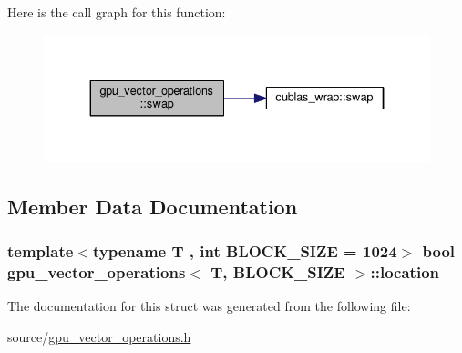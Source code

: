 Here is the call graph for this function\-:
\nopagebreak
\begin{figure}[H]
\begin{center}
\leavevmode
\includegraphics[width=334pt]{structgpu__vector__operations_a29768a8d4f6da7a9d3d4a49d4517bb23_cgraph}
\end{center}
\end{figure}




\subsection{Member Data Documentation}
\hypertarget{structgpu__vector__operations_abff92b3240864d39244e5cdfe43ec048}{
\subsubsection[{location}]{\setlength{\rightskip}{0pt plus 5cm}template$<$typename T , int B\-L\-O\-C\-K\-\_\-\-S\-I\-Z\-E = 1024$>$ bool {\bf gpu\-\_\-vector\-\_\-operations}$<$ T, B\-L\-O\-C\-K\-\_\-\-S\-I\-Z\-E $>$\-::location}}\label{structgpu__vector__operations_abff92b3240864d39244e5cdfe43ec048}


The documentation for this struct was generated from the following file\-:\begin{DoxyCompactItemize}
\item 
source/\hyperlink{gpu__vector__operations_8h}{gpu\-\_\-vector\-\_\-operations.\-h}\end{DoxyCompactItemize}
